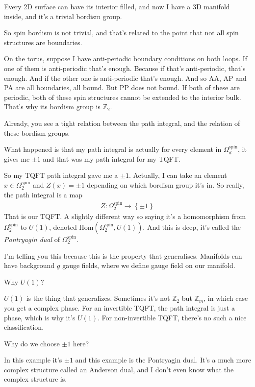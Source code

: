 Every 2D surface can have its interior filled,
and now I have a 3D manifold inside,
and it's a trivial bordism group.

So spin bordism is not trivial,
and that's related to the point that not all spin structures are boundaries.

On the torus,
suppose I have anti-periodic boundary conditions on both loops.
If one of them is anti-periodic that's enough.
Because if that's anti-periodic,
that's enough.
And if the other one is anti-periodic that's enough.
And so AA, AP and PA are all boundaries,
all bound.
But PP does not bound.
If both of these are periodic,
both of these spin structures cannot be extended to the interior bulk.
That's why its bordism group is $\mathbb{Z}_2$.

Already, you see a tight relation between the path integral,
and the relation of these bordism groups.

What happened is that my path integral is actually
for every element in $\Omega_d^{\textrm{spin}}$,
it gives me $\pm 1$ and that was my path integral for my TQFT.

So my TQFT path integral gave me a $\pm 1$.
Actually, I can take an element
$x \in \Omega_2^{\textrm{spin}}$
and $Z(x)=\pm 1$
depending on which bordism group it's in.
So really, the path integral is a map
\begin{align}
    Z: \Omega_2^{\textrm{spin}} \to \left\{ \pm 1 \right\}
\end{align}
That is our TQFT.
A slightly different way so saying it's a homomorphism
from $\Omega_2^{\textrm{spin}}$ to $U(1)$,
denoted
$\textrm{Hom}\left( \Omega_2^{\textrm{spin}}, U(1) \right)$.
And this is deep,
it's called the
\emph{Pontryagin dual} of $\Omega_2^{\textrm{spin}}$.

I'm telling you this because this is the property that generalises.
Manifolds can have background $g$ gauge fields,
where we define gauge field on our manifold.

\begin{question}
    Why $U(1)$?
\end{question}
$U(1)$ is the thing that generalizes.
Sometimes it's not $\mathbb{Z}_2$ but $\mathbb{Z}_m$,
in which case you get a complex phase.
For an invertible TQFT,
the path integral is just a phase,
which is why it's $U(1)$.
For non-invertible TQFT,
there's no such a nice classification.

\begin{question}
    Why do we choose $\pm 1$ here?
\end{question}
In this example it's $\pm 1$ and this example is the
Pontryagin dual.
It's a much more complex structure called an Anderson dual,
and I don't even know what the complex structure is.

